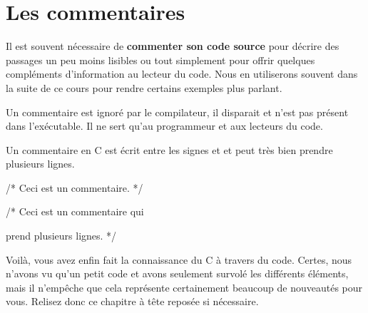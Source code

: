 \section{Les commentaires}

Il est souvent nécessaire de \textbf{commenter son code source} pour
décrire des passages un peu moins lisibles ou tout simplement pour
offrir quelques compléments d'information au lecteur du code. Nous en
utiliserons souvent dans la suite de ce cours pour rendre certains
exemples plus parlant.

Un commentaire est ignoré par le compilateur, il disparait et n'est
pas présent dans l'exécutable. Il ne sert qu'au programmeur et aux
lecteurs du code.

Un commentaire en C est écrit entre les signes \mybox{/*} et
\mybox{*/} et peut très bien prendre plusieurs lignes.

\begin{C}
/* Ceci est un commentaire. */
\end{C}


\begin{C}
/* Ceci est un commentaire qui

prend plusieurs lignes. */
\end{C}

Voilà, vous avez enfin fait la connaissance du C à travers du
code. Certes, nous n'avons vu qu'un petit code et avons seulement
survolé les différents éléments, mais il n'empêche que cela représente
certainement beaucoup de nouveautés pour vous. Relisez donc ce
chapitre à tête reposée si nécessaire.
